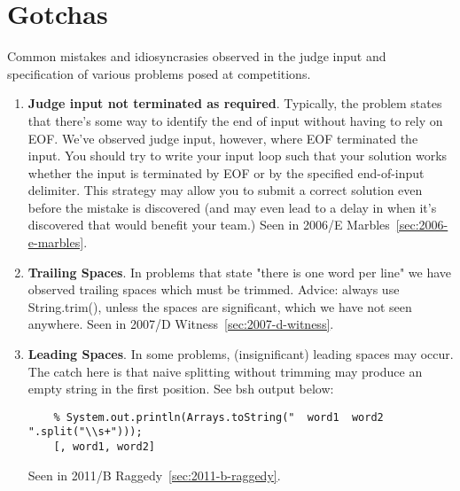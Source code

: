 \chapter{Gotchas}

Common mistakes and idiosyncrasies observed in the judge input and specification of
various problems posed at competitions.

\begin{enumerate}
\item \textbf{Judge input not terminated as required}. Typically, the problem states that
    there's some way to identify the end of input without having to rely on EOF.
    We've observed judge input, however, where EOF terminated the input.
    You should try to write your input loop such that your solution works whether
    the input is terminated by EOF or by the specified end-of-input delimiter.
    This strategy may allow you to submit a correct solution even before the mistake
    is discovered (and may even lead to a delay in when it's discovered that would benefit
    your team.)
    Seen in 2006/E Marbles~\ref{sec:2006-e-marbles}.

\item \textbf{Trailing Spaces}.
    In problems that state "there is one word per line" we have observed trailing spaces
    which must be trimmed.   Advice: always use String.trim(), unless the spaces are
    significant, which we have not seen anywhere.
    Seen in 2007/D Witness~\ref{sec:2007-d-witness}.

\item \textbf{Leading Spaces}.
    In some problems, (insignificant) leading spaces may occur.  The catch here is that 
    naive splitting without trimming may produce an empty string in the first position.
    See bsh output below:
    \begin{Verbatim}
    % System.out.println(Arrays.toString("  word1  word2  ".split("\\s+")));
    [, word1, word2]
    \end{Verbatim}
 
    Seen in 2011/B Raggedy~\ref{sec:2011-b-raggedy}.

\end{enumerate}

